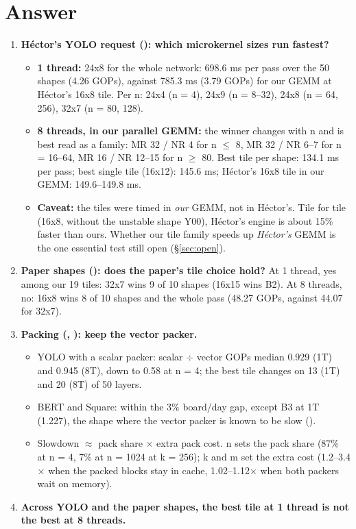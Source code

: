 \section*{Answer}
\begin{enumerate}\setlength\itemsep{4pt}
\item \textbf{H\'ector's YOLO request (): which microkernel sizes run fastest?}
  \begin{itemize}\setlength\itemsep{1pt}
  \item \textbf{1 thread:} 24x8 for the whole network: 698.6 ms per pass over the 50 shapes (4.26 GOPs), against 785.3 ms (3.79 GOPs) for our GEMM at H\'ector's 16x8 tile. Per n: 24x4 (n = 4), 24x9 (n = 8--32), 24x8 (n = 64, 256), 32x7 (n = 80, 128).
  \item \textbf{8 threads, in our parallel GEMM:} the winner changes with n and is best read as a family: MR 32 / NR 4 for n $\le$ 8, MR 32 / NR 6--7 for n = 16--64, MR 16 / NR 12--15 for n $\ge$ 80. Best tile per shape: 134.1 ms per pass; best single tile (16x12): 145.6 ms; H\'ector's 16x8 tile in our GEMM: 149.6--149.8 ms.
  \item \textbf{Caveat:} the tiles were timed in \emph{our} GEMM, not in H\'ector's. Tile for tile (16x8, without the unstable shape Y00), H\'ector's engine is about 15\% faster than ours. Whether our tile family speeds up \emph{H\'ector's} GEMM is the one essential test still open (\S\ref{sec:open}).
  \end{itemize}
\item \textbf{Paper shapes (): does the paper's tile choice hold?} At 1 thread, yes among our 19 tiles: 32x7 wins 9 of 10 shapes (16x15 wins B2). At 8 threads, no: 16x8 wins 8 of 10 shapes and the whole pass (48.27 GOPs, against 44.07 for 32x7).
\item \textbf{Packing (, ): keep the vector packer.}
  \begin{itemize}\setlength\itemsep{1pt}
  \item YOLO with a scalar packer: scalar $\div$ vector GOPs median 0.929 (1T) and 0.945 (8T), down to 0.58 at n = 4; the best tile changes on 13 (1T) and 20 (8T) of 50 layers.
  \item BERT and Square: within the 3\% board/day gap, except B3 at 1T (1.227), the shape where the vector packer is known to be slow ().
  \item Slowdown $\approx$ pack share $\times$ extra pack cost. n sets the pack share (87\% at n = 4, 7\% at n = 1024 at k = 256); k and m set the extra cost (1.2--3.4$\times$ when the packed blocks stay in cache, 1.02--1.12$\times$ when both packers wait on memory).
  \end{itemize}
\item \textbf{Across YOLO and the paper shapes, the best tile at 1 thread is not the best at 8 threads.}
\end{enumerate}

